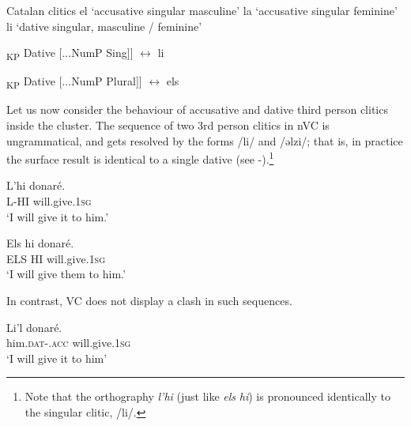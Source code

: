 \documentclass[output=paper,modfonts,nonflat,newtxmath,colorlinks,citecolor=brown]{langsci/langscibook}
\begin{document}
\ea%
	Catalan clitics
    \label{ex:cabre:11}
    \ea el ‘accusative singular masculine’ 
    \ex la ‘accusative singular feminine’
    \ex li ‘dative singular, masculine / feminine’ 
    \z
    \z
    
\ea%
    \label{ex:cabre:12}
   \ea {[}\textsubscript{KP}  Dative [...NumP Sing]{]} $\longleftrightarrow$ li
   
   \ex {[}\textsubscript{KP} Dative   [...NumP Plural]{]} $\longleftrightarrow$ els 
   \z
    \z

   
Let us now consider the behaviour of accusative and dative third person clitics inside the cluster. The sequence of two 3rd person clitics in nVC is ungrammatical, and gets resolved by the forms /li/ and /ǝlzi/; that is, in practice the surface result is identical to a single dative (see -).\footnote{Note that the orthography \textit{l’hi} (just like \textit{els} \textit{hi}) is pronounced identically to the singular clitic, /li/.} 

\ea
    \label{ex:cabre:13}
    
    \ex 
    \gll L’hi     donaré.\\
    L-HI    will.give.\textsc{1sg}\\
    \glt ‘I will give it to him.’
    \z
    \z

       

  

\ea%
    \label{ex:cabre:14}
   
   \ex 
   \gll Els hi  donaré.\\
   ELS HI  will.give.\textsc{1sg}\\
   \glt ‘I will give them to him.’
   \z
   \z
 

In contrast, VC does not display a clash in such sequences.

\ea%
    \label{ex:cabre:15}
     \ea
    \gll Li’l     donaré. \\
    	him.\textsc{dat}-.\textsc{acc} will.give.\textsc{1sg} \\
    	\glt ‘I will give it to him’
    
\end{document}

